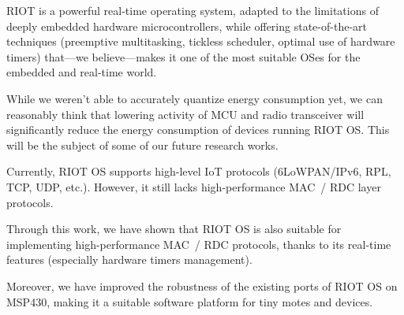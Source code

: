 \documentclass[a4paper,twoside]{article}
\begin{document}
RIOT is a powerful real-time operating system, adapted to the limitations
of deeply embedded hardware microcontrollers, while offering state-of-the-art
techniques (preemptive multitasking, tickless scheduler, optimal use
of hardware timers) that---we believe---makes it one of the most
suitable OSes for the embedded and real-time world.

While we weren't able to accurately quantize energy consumption
yet, we can reasonably think that lowering activity of MCU and radio
transceiver will significantly reduce the energy consumption of devices
running RIOT OS. This will be the subject of some of our future
research works.

\bigskip

Currently, RIOT OS supports high-level IoT protocols (6LoWPAN/IPv6, RPL,
TCP, UDP, etc.). However, it still lacks high-performance MAC~/ RDC layer
protocols.

Through this work, we have shown that RIOT OS is also suitable for
implementing high-performance MAC~/ RDC protocols, thanks to its real-time
features (especially hardware timers management).

Moreover, we have improved the robustness of the existing ports of RIOT OS
on MSP430, making it a suitable software platform for tiny motes and devices.






\vfill

{\small
}
\end{document}
